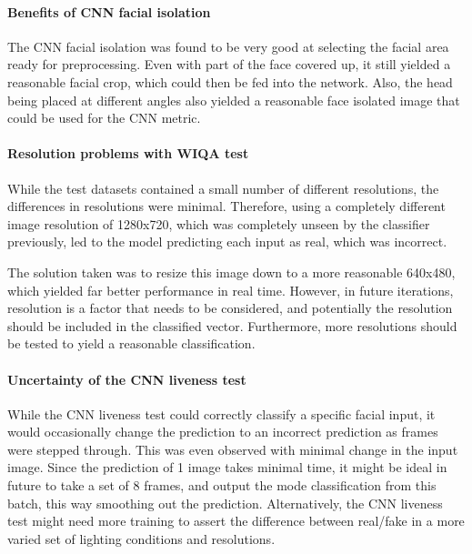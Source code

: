 \documentclass[12pt,a4paper]{article}
\begin{document}
        \begin{multicols}{2}
            \paragraph{Benefits of CNN facial isolation}
            The CNN facial isolation was found to be very good at selecting the facial area ready for preprocessing. Even with part of the face covered up, it still yielded a reasonable
            facial crop, which could then be fed into the network. Also, the head being placed at different angles also yielded a reasonable face isolated image that could be used for the
            CNN metric.
        
            \paragraph{Resolution problems with WIQA test}
                While the test datasets contained a small number of different resolutions, the differences in resolutions were minimal. Therefore, using a completely different image resolution
                of 1280x720, which was completely unseen by the classifier previously, led to the model predicting each input as real, which was incorrect.
    
                The solution taken was to resize this image down to a more reasonable 640x480, which yielded far better performance in real time. However, in future iterations, resolution is
                a factor that needs to be considered, and potentially the resolution should be included in the classified vector. Furthermore, more resolutions should be tested to yield a reasonable
                classification.
    
            \paragraph{Uncertainty of the CNN liveness test}
                While the CNN liveness test could correctly classify a specific facial input, it would occasionally change the prediction to an incorrect prediction
                as frames were stepped through. This was even observed with minimal change in the input image. Since the prediction of 1 image takes minimal time,
                it might be ideal in future to take a set of 8 frames, and output the mode classification from this batch, this way smoothing out the prediction.
                Alternatively, the CNN liveness test might need more training to assert the difference between real/fake in a more varied set of lighting conditions and resolutions.
    

\end{multicols}
\end{document}
